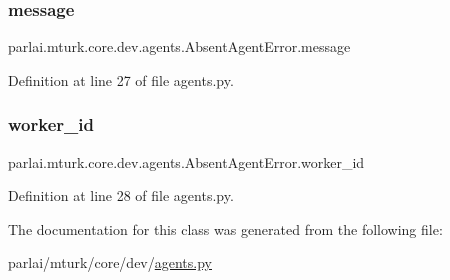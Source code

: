 \subsubsection{\texorpdfstring{message}{message}}
{\footnotesize\ttfamily parlai.\+mturk.\+core.\+dev.\+agents.\+Absent\+Agent\+Error.\+message}



Definition at line 27 of file agents.\+py.

\mbox{\label{classparlai_1_1mturk_1_1core_1_1dev_1_1agents_1_1AbsentAgentError_a26db50c87a5d4954907d538de3da875c}} 
\subsubsection{\texorpdfstring{worker\+\_\+id}{worker\_id}}
{\footnotesize\ttfamily parlai.\+mturk.\+core.\+dev.\+agents.\+Absent\+Agent\+Error.\+worker\+\_\+id}



Definition at line 28 of file agents.\+py.



The documentation for this class was generated from the following file\+:\begin{DoxyCompactItemize}
\item 
parlai/mturk/core/dev/\hyperlink{parlai_2mturk_2core_2dev_2agents_8py}{agents.\+py}\end{DoxyCompactItemize}
